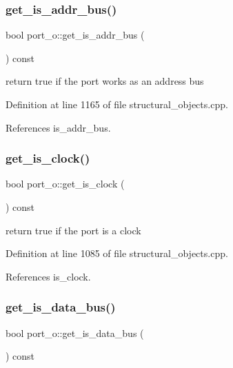 \subsubsection{\texorpdfstring{get\+\_\+is\+\_\+addr\+\_\+bus()}{get\_is\_addr\_bus()}}
{\footnotesize\ttfamily bool port\+\_\+o\+::get\+\_\+is\+\_\+addr\+\_\+bus (\begin{DoxyParamCaption}{ }\end{DoxyParamCaption}) const}



return true if the port works as an address bus 



Definition at line 1165 of file structural\+\_\+objects.\+cpp.



References is\+\_\+addr\+\_\+bus.

\mbox{\label{structport__o_a952e3f6145d24998df4cabdfcf928dd0}} 
\subsubsection{\texorpdfstring{get\+\_\+is\+\_\+clock()}{get\_is\_clock()}}
{\footnotesize\ttfamily bool port\+\_\+o\+::get\+\_\+is\+\_\+clock (\begin{DoxyParamCaption}{ }\end{DoxyParamCaption}) const}



return true if the port is a clock 



Definition at line 1085 of file structural\+\_\+objects.\+cpp.



References is\+\_\+clock.

\mbox{\label{structport__o_a35f8ee2310598883a7e663532235a6e0}} 
\subsubsection{\texorpdfstring{get\+\_\+is\+\_\+data\+\_\+bus()}{get\_is\_data\_bus()}}
{\footnotesize\ttfamily bool port\+\_\+o\+::get\+\_\+is\+\_\+data\+\_\+bus (\begin{DoxyParamCaption}{ }\end{DoxyParamCaption}) const}



